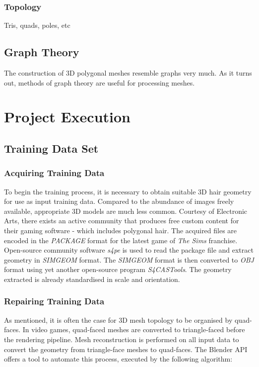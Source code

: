 \documentclass[ %
author={Dillon Keith Diep [INCOMPLETE DRAFT, NOT FOR SUBMISSION]},
supervisor={Dr. Carl Henrik Ek},
degree={MEng},
title={ARt-CG:},
subtitle={Assisted Real-time Content Generation of 3D Hair by Learning Manifolds},
type={Research},
year={2014} ]{dissertation}
\begin{document}
\subsection{Topology}
Tris, quads, poles, etc

\section{Graph Theory}
The construction of 3D polygonal meshes resemble graphs very much. As it turns out, methods of graph theory are useful for processing meshes.





\chapter{Project Execution}
\label{chap:execution}

\section{Training Data Set}
\subsection{Acquiring Training Data}
To begin the training process, it is necessary to obtain suitable 3D hair geometry for use as input training data. Compared to the abundance of images freely available, appropriate 3D models are much less common. Courtesy of Electronic Arts, there exists an active community that produces free custom content for their gaming software - which includes polygonal hair. \cite{tsr} The acquired files are encoded in the \textit{PACKAGE} format for the latest game of \textit{The Sims} franchise. Open-source community software \textit{s4pe} is used to read the package file and extract geometry in \textit{SIMGEOM} format. \cite{s4pe} The \textit{SIMGEOM} format is then converted to \textit{OBJ} format using yet another open-source program \textit{S4CASTools}. \cite{s4cas} The geometry extracted is already standardised in scale and orientation.

\subsection{Repairing Training Data}
As mentioned, it is often the case for 3D mesh topology to be organised by quad-faces. In video games, quad-faced meshes are converted to triangle-faced before the rendering pipeline. Mesh reconstruction is performed on all input data to convert the geometry from triangle-face meshes to quad-faces. The Blender API offers a tool to automate this process, executed by the following algorithm:
\end{document}
